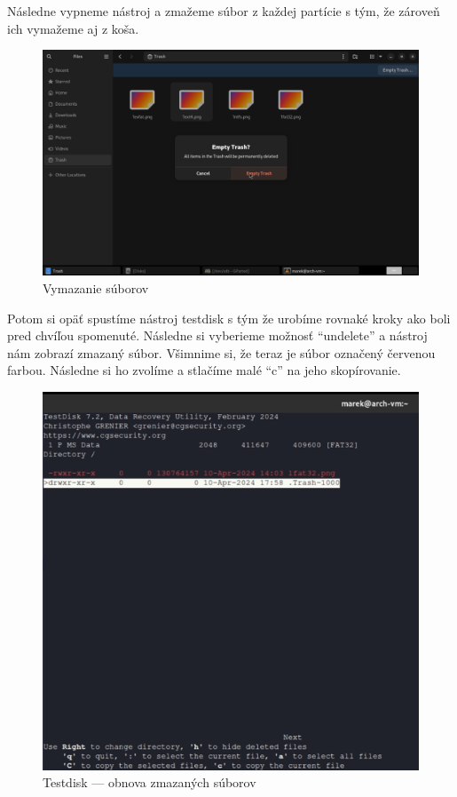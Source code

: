 \documentclass[12pt,oneside,slovak,a4paper]{article}
\begin{document}
Následne vypneme nástroj a zmažeme súbor z každej partície s tým, že zároveň ich vymažeme aj z koša.

\begin{figure}[H]
	\centering
	\includegraphics[width=\linewidth]{./images/testdisk_testing/file_deletion.png}
	\centering
	\captionsetup{justification=centering,margin=2cm}
	\caption{Vymazanie súborov}
\end{figure}

\pagebreak

Potom si opäť spustíme nástroj testdisk s tým že urobíme rovnaké kroky ako boli pred chvíľou spomenuté. Následne si vyberieme možnosť ``undelete'' a nástroj nám zobrazí zmazaný súbor. Všimnime si, že teraz je súbor označený červenou farbou. Následne si ho zvolíme a stlačíme malé ``c'' na jeho skopírovanie.

\begin{figure}[H]
	\centering
	\includegraphics[scale=0.7]{./images/testdisk_testing/testdisk_deleted_file_recovery.png}
	\centering
	\captionsetup{justification=centering,margin=2cm}
	\caption{Testdisk --- obnova zmazaných súborov}
\end{figure}
\end{document}
